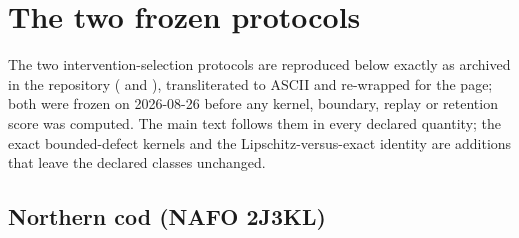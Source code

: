 \section{The two frozen protocols}\label{si:protocols}
The two intervention-selection protocols are reproduced below exactly as archived in the repository ( and ), transliterated to ASCII and re-wrapped for the page; both were frozen on 2026-08-26 before any kernel, boundary, replay or retention score was computed. The main text follows them in every declared quantity; the exact bounded-defect kernels and the Lipschitz-versus-exact identity are additions that leave the declared classes unchanged.
\subsection{Northern cod (NAFO 2J3KL)}

